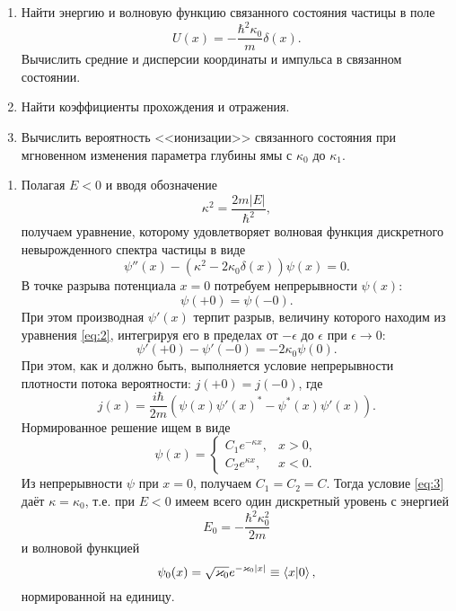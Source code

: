 \documentclass[a4paper]{article}
\begin{document}
\begin{problem}
	\label{prob:3}
	\renewcommand{\labelenumi}{\asbuk{enumi})}
	\begin{enumerate}
		\item 
	Найти энергию и волновую функцию связанного состояния
	частицы в поле
	\[
		U(x)= - \frac{\hbar^2\kappa_0}{m}\delta(x)
	.\] 
	Вычислить средние и дисперсии координаты и импульса в
	связанном состоянии.
	\item Найти коэффициенты прохождения и отражения.
	\item Вычислить вероятность <<ионизации>> связанного
		состояния при мгновенном изменения параметра
		глубины ямы с $\kappa_0$ до $\kappa_1$.
	\end{enumerate}
\end{problem}
\begin{sol}
\renewcommand{\labelenumi}{\asbuk{enumi})}
\begin{enumerate}
\item Полагая $E<0$ и вводя обозначение
	\[
	\kappa^2= \frac{2 m |E|}{\hbar^2}
	,\]
получаем уравнение, которому удовлетворяет волновая функция
дискретного невырожденного спектра частицы в виде
\begin{equation}
	\psi''(x)-\left( \kappa^2 - 2\kappa_0 \delta(x) \right) 
	\psi(x)=0
	\label{eq:2}
.\end{equation} 
В точке разрыва потенциала $x=0$ потребуем непрерывности
$\psi(x)$:
\[
	\psi(+0)=\psi(-0)
.\] 
При этом производная $\psi'(x)$ терпит разрыв, величину которого
находим из уравнения \eqref{eq:2}, интегрируя его в пределах
от $-\epsilon $ до $\epsilon$ при $\epsilon \to 0$:
\begin{equation}
	\psi'(+0)-\psi'(-0)=-2\kappa_0 \psi (0)
	\label{eq:3}
.\end{equation}
При этом, как и должно быть, выполняется условие непрерывности
плотности потока вероятности: $j(+0)=j(-0)$, где
\[
	j(x)= \frac{i\hbar }{2m} \left( \psi(x)\psi'(x)^*-
	\psi^*(x)\psi'(x)\right) 
.\] 
Нормированное решение ищем в виде
\[
	\psi(x)= 
	\begin{cases}
		C_1 e^{-\kappa x},& x>0,\\
		C_2 e^{\kappa x},& x<0.
	\end{cases}
\]
Из непрерывности $\psi$ при $x=0$, получаем $C_1=C_2=C$. Тогда
условие  \eqref{eq:3} даёт $\kappa=\kappa_0$, т.\:е.
при $E<0$ имеем всего один дискретный уровень с энергией
\[
E_0= -\frac{\hbar^2 \kappa_0^2}{2m}
\]
и волновой функцией
\[
	\psi_0(x)= \sqrt{\varkappa_0} e^{-\varkappa_0 |x|}\equiv
	\braket{x|0}
 ,\]
нормированной на единицу.


\end{enumerate}
\end{sol}
\end{document}
